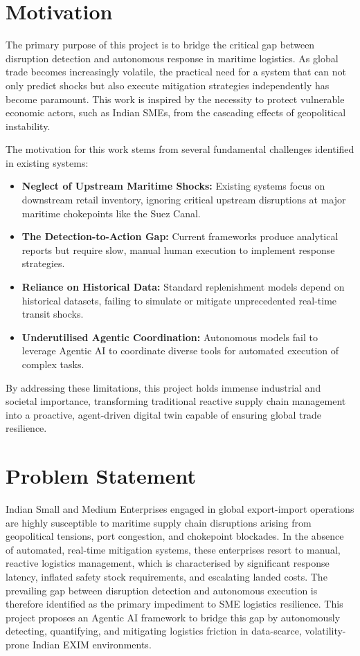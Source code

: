\section[Motivation]{\textbf{Motivation}}

The primary purpose of this project is to bridge the critical gap between disruption detection and autonomous response in maritime logistics. As global trade becomes increasingly volatile, the practical need for a system that can not only predict shocks but also execute mitigation strategies independently has become paramount. This work is inspired by the necessity to protect vulnerable economic actors, such as Indian SMEs, from the cascading effects of geopolitical instability.

The motivation for this work stems from several fundamental challenges identified in existing systems:
\begin{itemize}
    \item \textbf{Neglect of Upstream Maritime Shocks:} Existing systems focus on downstream retail inventory, ignoring critical upstream disruptions at major maritime chokepoints like the Suez Canal.
    \item \textbf{The Detection-to-Action Gap:} Current frameworks produce analytical reports but require slow, manual human execution to implement response strategies.
    \item \textbf{Reliance on Historical Data:} Standard replenishment models depend on historical datasets, failing to simulate or mitigate unprecedented real-time transit shocks.
    \item \textbf{Underutilised Agentic Coordination:} Autonomous models fail to leverage Agentic AI to coordinate diverse tools for automated execution of complex tasks.
\end{itemize}

By addressing these limitations, this project holds immense industrial and societal importance, transforming traditional reactive supply chain management into a proactive, agent-driven digital twin capable of ensuring global trade resilience.


\section[Problem Statement]{\textbf{Problem Statement}}
Indian Small and Medium Enterprises engaged in global export-import operations are highly susceptible to maritime supply chain disruptions arising from geopolitical tensions, port congestion, and chokepoint blockades. In the absence of automated, real-time mitigation systems, these enterprises resort to manual, reactive logistics management, which is characterised by significant response latency, inflated safety stock requirements, and escalating landed costs. The prevailing gap between disruption detection and autonomous execution is therefore identified as the primary impediment to SME logistics resilience. This project proposes an Agentic AI framework to bridge this gap by autonomously detecting, quantifying, and mitigating logistics friction in data-scarce, volatility-prone Indian EXIM environments.


